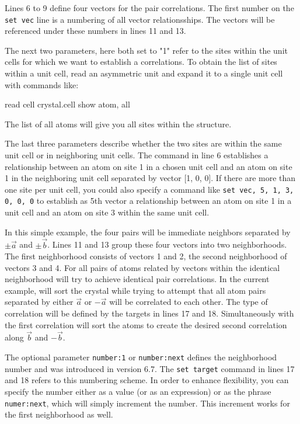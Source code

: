 Lines 6 to 9 define four vectors for the pair correlations. The first number on
the {\tt set vec} line is a numbering of all vector relationsships. The vectors
will be referenced under these numbers in lines 11 and 13. 

The next two parameters, here both set to "1" refer to the sites within the unit 
cells for which we want to establish a correlations. To obtain the list of sites
within a unit cell, read an asymmetric unit and expand it to a single unit cell
with commands like:
 
\begin{MacVerbatim}
  read
    cell crystal.cell
  show atom, all
\end{MacVerbatim}

The list of all atoms will give you all sites within the structure.

The last three parameters describe whether the two sites are within the same unit
cell or in neighboring unit cells. The command in line 6 establishes a relationship
between an atom on site 1 in a chosen unit cell and an atom on site 1 in the 
neighboring unit cell separated by vector [1, 0, 0]. If there are more than one site 
per unit cell, you could also specify a command like {\tt set vec, 5, 1, 3,  0, 0, 0} to 
establish as 5th vector a relationship between an atom on site 1 in a unit cell and an atom on 
site 3 within the same unit cell.

In this simple example, the four pairs will be immediate neighbors separated by
$\pm \vec{a}$ and $\pm \vec{b}$. Lines 11 and 13 group these four vectors into 
two neighborhoods. The first neighborhood consists of vectors 1 and 2, the 
second neighborhood of vectors 3 and 4. For all pairs of atoms related by vectors 
within the identical neighborhood \Discus will try to achieve identical pair
correlations. In the current example, \Discus will sort the crystal while trying 
to attempt that all atom pairs separated by either $\vec{a}$ or $-\vec{a}$ 
will be correlated to each other. The type of correlation will be defined by the 
targets in lines 17 and 18. Simultaneously with the first correlation \Discus
will sort the atoms to create the desired second correlation along 
$\vec{b}$ and $-\vec{b}$. 

The optional parameter {\tt number:1} or {\tt number:next} defines the neighborhood
number and was introduced in version 6.7. The {\tt set target} command in 
lines 17 and 18 refers to this numbering
scheme. In order to enhance flexibility, you can specify the number either as a 
value (or as an expression) or as the phrase {\tt numer:next}, which will simply
increment the number. This increment works for the first neighborhood as well.

